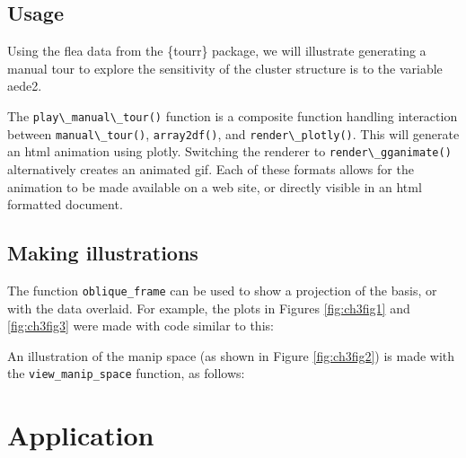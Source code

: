 \documentclass{monashthesis}
\begin{document}
\hypertarget{sec:usage}{%
\subsection{Usage}\label{sec:usage}}

Using the flea data from the \{tourr\} package, we will illustrate generating a manual tour to explore the sensitivity of the cluster structure is to the variable aede2.

\noindent The \texttt{play\textbackslash{}\_manual\textbackslash{}\_tour()} function is a composite function handling interaction between \texttt{manual\textbackslash{}\_tour()}, \texttt{array2df()}, and \texttt{render\textbackslash{}\_plotly()}. This will generate an html animation using plotly. Switching the renderer to \texttt{render\textbackslash{}\_gganimate()} alternatively creates an animated gif. Each of these formats allows for the animation to be made available on a web site, or directly visible in an html formatted document.

\hypertarget{making-illustrations}{%
\subsection{Making illustrations}\label{making-illustrations}}

The function \texttt{oblique\_frame} can be used to show a projection of the basis, or with the data overlaid. For example, the plots in Figures \ref{fig:ch3fig1} and \ref{fig:ch3fig3} were made with code similar to this:

\noindent An illustration of the manip space (as shown in Figure \ref{fig:ch3fig2}) is made with the \texttt{view\_manip\_space} function, as follows:

\begin{Shaded}
\begin{Highlighting}[]
\NormalTok{(}
                  
\end{Highlighting}
\end{Shaded}

\hypertarget{sec:application}{%
\section{Application}\label{sec:application}}
\end{document}
